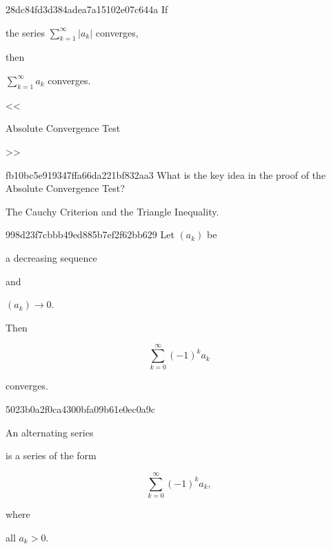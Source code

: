 \begin{note}{28dc84fd3d384adea7a15102e07c644a}
    If \begin{icloze}{2}the series \({ \sum_{k=1}^{\infty} \left\lvert a_k \right\rvert }\) converges,\end{icloze} then \begin{icloze}{1}\({ \sum_{k=1}^{\infty} a_k }\) converges.\end{icloze}

    \begin{center}
        \tiny
        <<\begin{icloze}{3}Absolute Convergence Test\end{icloze}>>
    \end{center}
\end{note}

\begin{note}{fb10bc5e919347ffa66da221bf832aa3}
    What is the key idea in the proof of the Absolute Convergence Test?

    \begin{cloze}{1}
        The Cauchy Criterion and the Triangle Inequality.
    \end{cloze}
\end{note}

\begin{note}{998d23f7cbbb49ed885b7ef2f62bb629}
    Let \({ (a_k) }\) be \begin{icloze}{4}a decreasing sequence\end{icloze} and \begin{icloze}{3}\({ (a_k) \to 0 }\).\end{icloze}
    Then
    \begin{icloze}{2}
        \[
            \sum_{k=0}^{\infty} (-1)^{k}a_k
        \]
    \end{icloze}
    \begin{icloze}{1}converges.\end{icloze}
\end{note}

\begin{note}{5023b0a2f0ca4300bfa09b61e0ec0a9c}
    \begin{icloze}{1}An alternating series\end{icloze} is a series of the form
    \begin{icloze}{2}
        \[
            \sum_{k=0}^{\infty} (-1)^{k}a_k,
        \]
    \end{icloze}
    where \begin{icloze}{3}all \({ a_k > 0 }\).\end{icloze}
\end{note}

